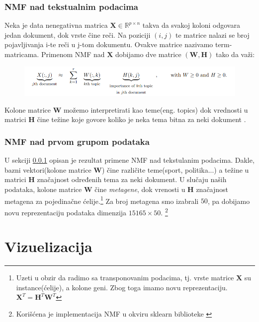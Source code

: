 \documentclass[a4paper]{article}
\begin{document}
\subsubsection{NMF nad tekstualnim podacima}
\label{text_nmf}
Neka je data nenegativna matrica $\mathbf{X} \in \mathbb{R}^{p\times n}$ takva da svakoj koloni odgovara jedan dokument, dok vrste čine reči. Na poziciji $(i, j)$ te matrice nalazi se broj pojavljivanja i-te reči u j-tom dokumentu. Ovakve matrice nazivamo term-matricama. Primenom NMF nad  $\mathbf{X}$ dobijamo dve matrice  $(\mathbf{W}, \mathbf{H})$ tako da važi:


\begin{figure}[H]
\centering
\includegraphics[width=\textwidth]{text_nmf}
\end{figure}


Kolone matrice $\mathbf{W}$ možemo interpretirati kao teme(eng. topics) dok vrednosti u matrici $\mathbf{H}$ čine težine koje govore koliko je neka tema bitna za neki dokument \cite{gillis2014and}.

\subsubsection{NMF nad prvom grupom podataka}
\label{genes_nmf}
U sekciji \ref{text_nmf} opisan je rezultat primene NMF nad tekstulanim podacima. Dakle, bazni vektori(kolone matrice $\mathbf{W}$) čine različite teme(sport, politika...) a težine u matrici $\mathbf{H}$ značajnost određenih tema za neki dokument. U slučaju naših podataka, kolone matrice $\mathbf{W}$ čine \textit{metagene}, dok vrenosti u $\mathbf{H}$ značajnost metagena za pojedinačne ćelije.\footnote{Uzeti u obzir da radimo sa transponovanim podacima, tj. vrste matrice $\mathbf{X}$ su instance(ćelije), a kolone geni. Zbog toga imamo novu reprezentaciju. $\mathbf{X}^T = \mathbf{H}^T\mathbf{W}^T$} Za broj metagena smo izabrali $50$, pa dobijamo novu reprezentaciju podataka dimenzija $15165 \times 50$. \footnote{Korišćena je implementacija NMF u okviru sklearn biblioteke \cite{scikit-learn}}


\section{Vizuelizacija}
\end{document}
